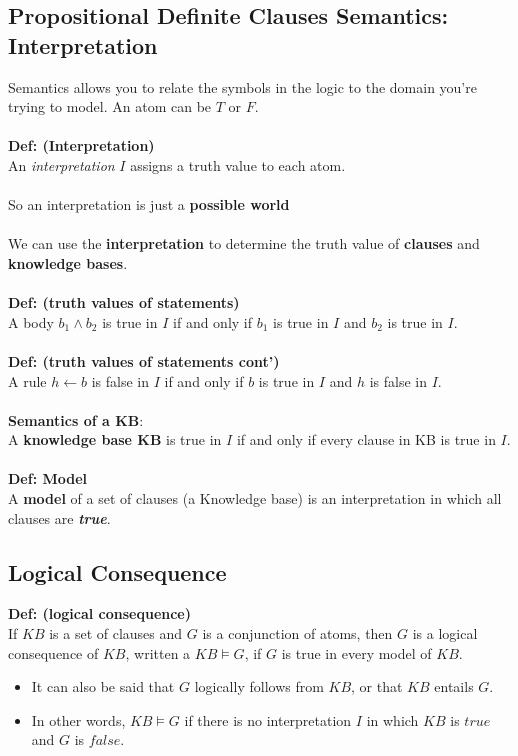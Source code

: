\documentclass{article}
\def\blu#1{{\color{blu}#1}}
\def\red#1{{\color{red}#1}}
\begin{document}
\subsection*{Propositional Definite Clauses Semantics: Interpretation}
Semantics allows you to relate the symbols in the logic to the domain you're trying to model. An atom can be $ T $ or $ F $. \\
\\
\textbf{Def: (Interpretation)}\\
An \textit{\blu{interpretation}} $ I $ assigns a truth value to each atom. \\
\\
So an interpretation is just a \blu{\textbf{possible world}}\\
\\
We can use the \textbf{interpretation} to determine the truth value of \textbf{clauses} and \textbf{knowledge bases}. \\
\\
\textbf{Def: (truth values of statements)}\\
A \blu{body $ b_1 \land b_2 $ is true in $ I $} if and only if $ b_1 $ is true in $ I $ and $ b_2 $ is true in $ I $. \\
\\
\textbf{Def: (truth values of statements cont')}\\
A \blu{rule $ h \leftarrow b $ is false in $ I $} if and only if \blu{$ b $ is true in $ I $} and \blu{$ h $ is false in $ I $}. \\
\\
\textbf{Semantics of a KB}: \\
A \textbf{\red{knowledge base KB}} is true in $ I $ if and only if every clause in KB is true in $ I $. \\
\\
\textbf{Def: Model}\\
A \textbf{model} of a set of clauses (a Knowledge base) is an interpretation in which all clauses are \textbf{\textit{true}}.

\subsection*{Logical Consequence}
\textbf{Def: (logical consequence)}\\
If $ KB $ is a set of clauses and $ G $ is a conjunction of atoms, then $ G $ is a logical consequence of $ KB $, written a $ KB \vDash G $, if $ G $ is true in every model of $ KB $.\\
\begin{itemize}
	\item It can also be said that $ G $ \blu{logically follows} from $ KB $, or that $ KB $ entails $ G $. 
	\item In other words, $ KB \vDash G $ if there is no interpretation $ I $ in which $ KB $ is $ true $ and $ G $ is $ false $.
\end{itemize}
\end{document}
